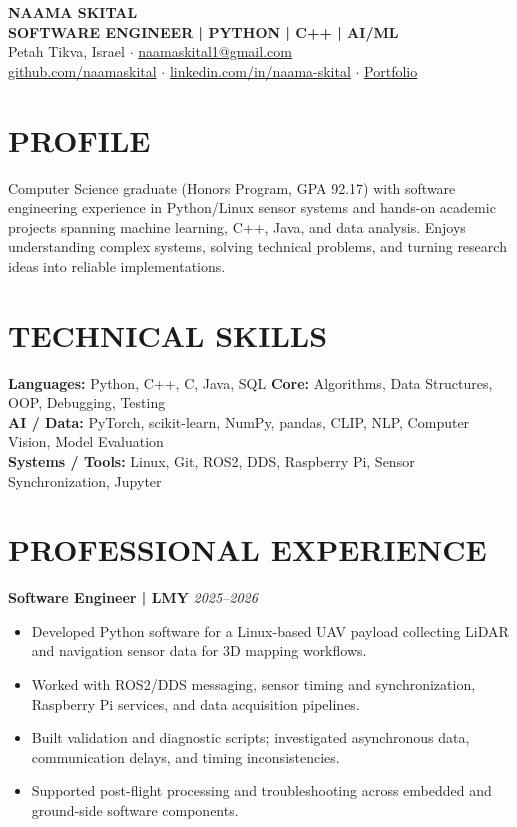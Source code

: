 \documentclass[10pt,a4paper]{article}
\begin{document}
\begin{center}
{\fontsize{23}{26}\selectfont\bfseries\color{navy} NAAMA SKITAL}\\[3pt]
{\color{purple}\bfseries SOFTWARE ENGINEER \quad | \quad PYTHON \quad | \quad C++ \quad | \quad AI/ML}\\[5pt]
Petah Tikva, Israel \quad $\cdot$ \quad \href{mailto:naamaskital1@gmail.com}{naamaskital1@gmail.com}\\[2pt]
\href{https://github.com/naamaskital}{github.com/naamaskital} \quad $\cdot$ \quad \href{https://www.linkedin.com/in/naama-skital/}{linkedin.com/in/naama-skital} \quad $\cdot$ \quad \href{https://naama-portfolio-aa3b.vercel.app/}{Portfolio}
\end{center}
\section*{PROFILE}
Computer Science graduate (Honors Program, GPA 92.17) with software engineering experience in Python/Linux sensor systems and hands-on academic projects spanning machine learning, C++, Java, and data analysis. Enjoys understanding complex systems, solving technical problems, and turning research ideas into reliable implementations.
\section*{TECHNICAL SKILLS}
\textbf{Languages:} Python, C++, C, Java, SQL \quad \textbf{Core:} Algorithms, Data Structures, OOP, Debugging, Testing\\
\textbf{AI / Data:} PyTorch, scikit-learn, NumPy, pandas, CLIP, NLP, Computer Vision, Model Evaluation\\
\textbf{Systems / Tools:} Linux, Git, ROS2, DDS, Raspberry Pi, Sensor Synchronization, Jupyter
\section*{PROFESSIONAL EXPERIENCE}
\textbf{Software Engineer \quad | \quad LMY} \hfill \textit{2025--2026}
\begin{itemize}
\item Developed Python software for a Linux-based UAV payload collecting LiDAR and navigation sensor data for 3D mapping workflows.
\item Worked with ROS2/DDS messaging, sensor timing and synchronization, Raspberry Pi services, and data acquisition pipelines.
\item Built validation and diagnostic scripts; investigated asynchronous data, communication delays, and timing inconsistencies.
\item Supported post-flight processing and troubleshooting across embedded and ground-side software components.
\end{itemize}
\end{document}
